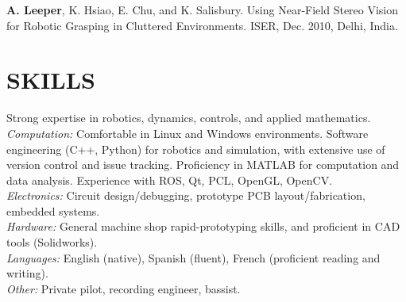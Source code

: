 \documentclass[line,margin]{res}
\newcommand{\CVOnly}[1]{}
\newcommand{\CVOnlySmall}[1]{{\small \CVOnly{#1}}}
\newcommand{\BothSmall}[1]{{\small #1}}   }
\newcommand{\CVOnly}[1]{#1}
\newcommand{\CVOnlySmall}[1]{{\CVOnly{#1}}}
\newcommand{\BothSmall}[1]{{#1}}    }
\newcommand{\boldName}[1]{\textbf{#1}}
\begin{document}
\begin{resume}
%
\CVOnlySmall{D. Gossow, \boldName{A. Leeper}, D. Hershberger, M. Ciocarlie. Interactive Markers: 3-D User Interfaces for ROS Applications [ROS Topics]. IEEE Robotics and Automation Magazine, December 2011. \\[0.4pc]}
%
\CVOnlySmall{\boldName{A. Leeper}, S. Chan, and K. Salisbury. Constraint-based 3-DOF Haptic Rendering of Arbitrary Point Cloud Data. RSS Workshop on RGB-D Cameras, June 2011, Los Angeles, CA. \\[0.4pc]}
%
\BothSmall{\boldName{A. Leeper}, K. Hsiao, E. Chu, and K. Salisbury. Using Near-Field Stereo Vision for Robotic Grasping in Cluttered Environments. ISER, Dec. 2010, Delhi, India.  \CVOnlySmall{\\[0.4pc]} }
%
\CVOnlySmall{Caruso, John F; Hari, P; \boldName{Leeper, Adam E}; Coday, Michael A; Monda, Julie K; Ramey, Elizabeth S; Hastings, Lori P; Golden, Mallory R; Davison, Steve W. Impact of Acceleration on Blood Lactate Values Derived From High-Speed Resistance Exercise. Journal of Strength \& Conditioning Research. 23(7):2009-2014, October 2009.  \\[0.4pc]}
%
\CVOnlySmall{Caruso J.F., Hari P., Coday M.A., \boldName{Leeper A.}, Ramey E.S., Monda J.K., Hastings L.P., and Davison S. (2008). Performance evaluation of a high-speed inertial exercise trainer. The Journal of Strength \& Conditioning Research. 22(6): 1760-1768. \\[0.4pc]}
%
\CVOnlySmall{\boldName{A. Leeper}, M. Coday, P. Hari, J. Caruso. Instrumentation of a High-Speed Inertial Exercise Device Using Load Cell Transducers. Proceedings of 53rd IIS, April 2007, Tulsa, OK.}
%
%
\section{SKILLS}
\vspace{1.0pc}Strong expertise in robotics, dynamics, controls, and applied mathematics.
\\[0.25pc] {\sl Computation: }
Comfortable in Linux and Windows environments.
Software engineering (C++, Python) for robotics and simulation, with extensive use of version control and issue tracking. 
Proficiency in MATLAB for computation and data analysis.
Experience with ROS, Qt, PCL, OpenGL, OpenCV. 
\\[0.25pc]{\sl Electronics: } Circuit design/debugging, prototype PCB layout/fabrication, embedded systems.  
\\[0.25pc]{\sl Hardware: } General machine shop rapid-prototyping skills, and proficient in CAD tools (Solidworks). 
\\[0.25pc]{\sl Languages: } English (native), Spanish (fluent), French (proficient reading and writing). 
\\[0.25 		pc]{\sl Other: } Private pilot, recording engineer, bassist.    
%
%
\CVOnly{
}
\end{resume}
\end{document}
